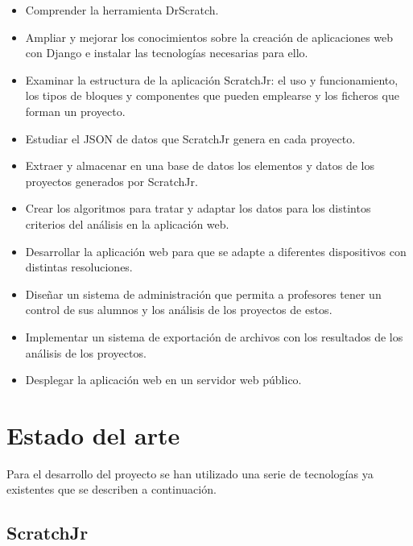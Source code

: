 \documentclass[a4paper, 12pt]{book}
\begin{document}
\begin{itemize}
    \item Comprender la herramienta DrScratch.
    \item Ampliar y mejorar los conocimientos sobre la creación de aplicaciones web con Django e instalar las tecnologías necesarias para ello.
    \item Examinar la estructura de la aplicación ScratchJr: el uso y funcionamiento, los tipos de bloques y componentes que pueden emplearse y los ficheros que forman un proyecto.
    \item Estudiar el JSON de datos que ScratchJr genera en cada proyecto.
    \item Extraer y almacenar en una base de datos los elementos y datos de los proyectos generados por ScratchJr.
    \item Crear los algoritmos para tratar y adaptar los datos para los distintos criterios del análisis en la aplicación web.
    \item Desarrollar la aplicación web para que se adapte a diferentes dispositivos con distintas resoluciones.
    \item Diseñar un sistema de administración que permita a profesores tener un control de sus alumnos y los análisis de los proyectos de estos.
    \item Implementar un sistema de exportación de archivos con los resultados de los análisis de los proyectos.
    \item Desplegar la aplicación web en un servidor web público.
    
\end{itemize}



\cleardoublepage
\chapter{Estado del arte}
\label{chap:estado}

Para el desarrollo del proyecto se han utilizado una serie de tecnologías ya existentes que se describen a continuación.


\section{ScratchJr}
\label{sec:scratchJr}
\end{document}
